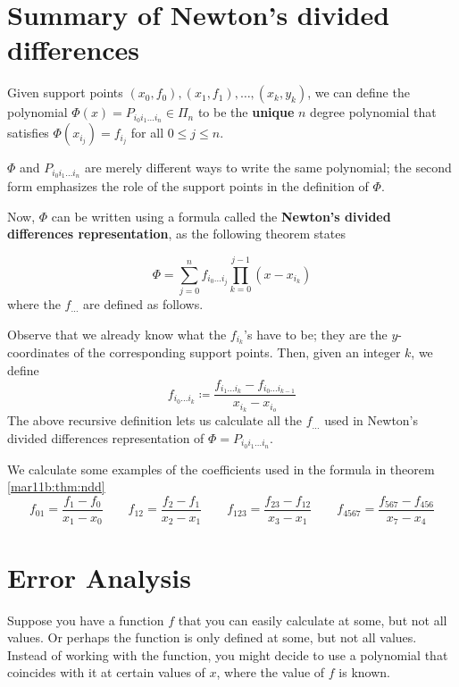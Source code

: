 
\section{Summary of Newton's divided differences}

\begin{defn}
  Given support points $(x_0, f_0), (x_1, f_1), \dots ,(x_k, y_k)$, we can define the polynomial $\Phi(x) = P_{i_0i_1\dots i_n} \in \Pi_n$ to be the \textbf{unique} $n$ degree polynomial that satisfies $\Phi(x_{i_j}) = f_{i_j}$ for all $0 \leq j \leq n$.
\end{defn}
\begin{rmk}
  $\Phi$ and $P_{i_0i_1\dots i_n}$ are merely different ways to write the same polynomial; the second form emphasizes the role of the support points in the definition of $\Phi$.
\end{rmk}

 Now, $\Phi$ can be written using a formula called the \textbf{Newton's divided differences representation}, as the following theorem states
 \begin{thm}
   \label{mar11b:thm:ndd}
  \[
    \Phi = \sum_{j = 0}^n f_{i_0\dots i_j}\prod_{k = 0}^{j-1}\left(x - x_{i_k}\right)
  \]
  where the $f_{\dots}$ are defined as follows.

  Observe that we already know what the $f_{i_k}$'s have to be; they are the $y$-coordinates of the corresponding support points.
  Then, given an integer $k$, we define
  \[
    f_{i_0\dots i_{k}} \coloneqq \frac{f_{i_1\dots i_{k}} - f_{i_0\dots i_{k-1}}}{x_{i_k} - x_{i_o}}
  \]
  The above recursive definition lets us calculate all the $f_{\dots}$ used in Newton's divided differences representation of $\Phi = P_{i_0i_1\dots i_n}$.
\end{thm}

\begin{example}
  We calculate some examples of the coefficients used in the formula in theorem \ref{mar11b:thm:ndd}
  \[
    f_{01} = \frac{f_1 - f_0}{x_1 - x_0}
    \qquad
    f_{12} = \frac{f_2 - f_1}{x_2 - x_1}
    \qquad
    f_{123} = \frac{f_{23} - f_{12}}{x_3 - x_1}
    \qquad
    f_{4567} = \frac{f_{567} - f_{456}}{x_7 - x_4}
  \]
\end{example}

\section{Error Analysis}
Suppose you have a function $f$ that you can easily calculate at some, but not all values. Or perhaps the function is only defined at some, but not all values. Instead of working with the function, you might decide to use a polynomial that coincides with it at certain values of $x$, where the value of $f$ is known.

